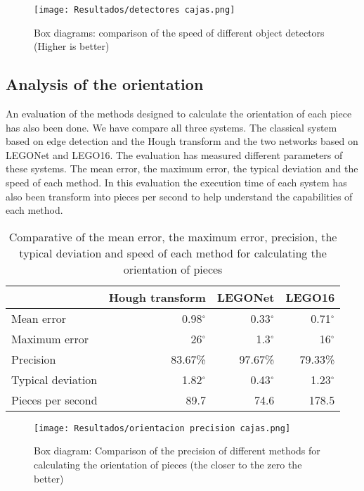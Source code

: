 {\begin{figure}[ht]  %
\vspace{-10pt}
	\centering
	\texttt{[image: Resultados/detectores cajas.png]}
	\caption{Box diagrams: comparison of the speed of different object detectors (Higher is better)}
	\label{fig:abs3}
\end{figure}

\subsection*{Analysis of the orientation}
An evaluation of the methods designed to calculate the orientation of each piece has also been done. We have compare all three systems. The classical system based on edge detection and the Hough transform and the two networks based on LEGONet and LEGO16. The evaluation has measured different parameters of these systems. The mean error, the maximum error, the typical deviation and the speed of each method. In this evaluation the execution time of each system has also been transform into pieces per second to help understand the capabilities of each method.

\begin{table}[ht] %
  \centering
    \begin{tabular}{|l|r|r|r|}
    \cline{2-4} \multicolumn{1}{r|}{} & \multicolumn{1}{l|}{Hough transform} & \multicolumn{1}{l|}{LEGONet} & \multicolumn{1}{l|}{LEGO16}\\	
    \hline
    Mean error & 0.98$^{\circ}$  & 0.33$^{\circ}$ & 0.71$^{\circ}$ \\
    \hline
    Maximum error & 26$^{\circ}$  & 1.3$^{\circ}$ & 16$^{\circ}$ \\
    \hline
    Precision & 83.67\% & 97.67\% & 79.33\% \\
    \hline
    Typical deviation & 1.82$^{\circ}$ & 0.43$^{\circ}$ & 1.23$^{\circ}$ \\
    \hline
    Pieces per second	&	89.7	&	74.6	&	178.5	\\
    \hline
    \end{tabular}%
  \label{tab:abs4}%
  \caption{Comparative of the mean error, the maximum error, precision, the typical deviation and speed of each method for calculating the orientation of pieces}
\end{table}

\begin{figure}[ht]  %
	\centering
	\texttt{[image: Resultados/orientacion precision cajas.png]}
	\caption{Box diagram: Comparison of the precision of different methods for calculating the orientation of pieces (the closer to the zero the better)}
	\label{fig:abs5}
\end{figure}

}
